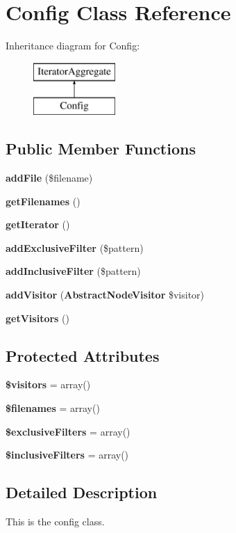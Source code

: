 \section{Config Class Reference}
\label{class_class_preloader_1_1_config}
Inheritance diagram for Config\+:\begin{figure}[H]
\begin{center}
\leavevmode
\includegraphics[height=2.000000cm]{class_class_preloader_1_1_config}
\end{center}
\end{figure}
\subsection*{Public Member Functions}
\begin{DoxyCompactItemize}
\item 
{\bf add\+File} (\$filename)
\item 
{\bf get\+Filenames} ()
\item 
{\bf get\+Iterator} ()
\item 
{\bf add\+Exclusive\+Filter} (\$pattern)
\item 
{\bf add\+Inclusive\+Filter} (\$pattern)
\item 
{\bf add\+Visitor} ({\bf Abstract\+Node\+Visitor} \$visitor)
\item 
{\bf get\+Visitors} ()
\end{DoxyCompactItemize}
\subsection*{Protected Attributes}
\begin{DoxyCompactItemize}
\item 
{\bf \$visitors} = array()
\item 
{\bf \$filenames} = array()
\item 
{\bf \$exclusive\+Filters} = array()
\item 
{\bf \$inclusive\+Filters} = array()
\end{DoxyCompactItemize}


\subsection{Detailed Description}
This is the config class.


